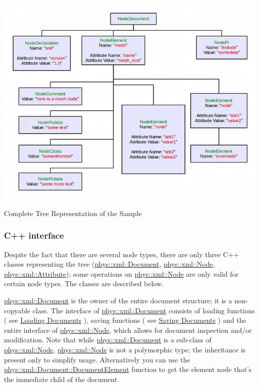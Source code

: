 \begin{DoxyItemize}
\begin{DoxyImage}
\includegraphics{SampleTree.jpg}
\caption{Complete Tree Representation of the Sample}
\end{DoxyImage}
  
\end{DoxyItemize}\hypertarget{XMLManual_XMLInterface}{}\subsubsection{C++ interface}\label{XMLManual_XMLInterface}
Despite the fact that there are several node types, there are only three C++ classes representing the tree (\hyperlink{classphys_1_1xml_1_1Document}{phys::xml::Document}, \hyperlink{classphys_1_1xml_1_1Node}{phys::xml::Node}, \hyperlink{classphys_1_1xml_1_1Attribute}{phys::xml::Attribute}); some operations on \hyperlink{classphys_1_1xml_1_1Node}{phys::xml::Node} are only valid for certain node types. The classes are described below. \par
 \par
 \hyperlink{classphys_1_1xml_1_1Document}{phys::xml::Document} is the owner of the entire document structure; it is a non-\/copyable class. The interface of \hyperlink{classphys_1_1xml_1_1Document}{phys::xml::Document} consists of loading functions ( see \hyperlink{XMLManual_XMLLoading}{Loading Documents} ), saving functions ( see \hyperlink{XMLManual_XMLSaving}{Saving Documents} ) and the entire interface of \hyperlink{classphys_1_1xml_1_1Node}{phys::xml::Node}, which allows for document inspection and/or modification. Note that while \hyperlink{classphys_1_1xml_1_1Document}{phys::xml::Document} is a sub-\/class of \hyperlink{classphys_1_1xml_1_1Node}{phys::xml::Node}, \hyperlink{classphys_1_1xml_1_1Node}{phys::xml::Node} is not a polymorphic type; the inheritance is present only to simplify usage. Alternatively you can use the \hyperlink{classphys_1_1xml_1_1Document_a93d8521e3241281e15f77cf7568d5754}{phys::xml::Document::DocumentElement} function to get the element node that's the immediate child of the document. \par
